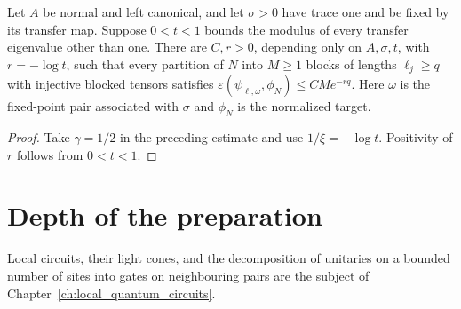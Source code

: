 \begin{lemma}
    \label{lem:ldp_positive_block_preparation_rate}
    \leanok
    Let $A$ be normal and left canonical, and let $\sigma>0$ have trace one
    and be fixed by its transfer map. Suppose $0<t<1$ bounds the modulus of
    every transfer eigenvalue other than one. There are $C,r>0$, depending
    only on $A,\sigma,t$, with $r=-\log t$, such that every partition of $N$
    into $M\ge1$ blocks of lengths $\ell_j\ge q$ with injective blocked
    tensors satisfies $\varepsilon(\psi_{\ell,\omega},\phi_N)\le CMe^{-rq}$.
    Here $\omega$ is the fixed-point pair associated with $\sigma$ and
    $\phi_N$ is the normalized target.
\end{lemma}
\begin{proof}\leanok
    Take $\gamma=1/2$ in the preceding estimate and use $1/\xi=-\log t$.
    Positivity of $r$ follows from $0<t<1$.
\end{proof}

\section{Depth of the preparation}

Local circuits, their light cones, and the decomposition of unitaries on a
bounded number of sites into gates on neighbouring pairs are the subject of
Chapter~\ref{ch:local_quantum_circuits}.

